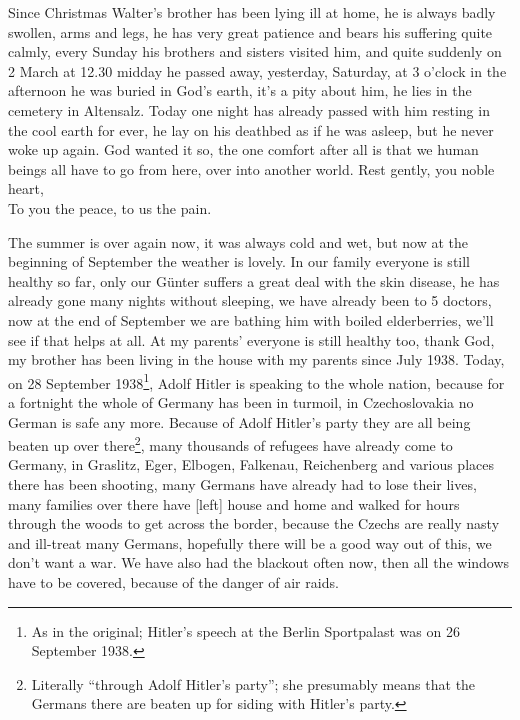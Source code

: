 \documentclass[a5paper,11pt,openany]{book}
\newcommand{\seite}[1]{\leavevmode\marginpar{\footnotesize\itshape\raggedright #1}\ignorespaces}
\newcommand{\jahr}[1]{\par\medskip\noindent{\scshape #1}\par\nopagebreak}
\begin{document}
\jahr{The year 1938.}
Since Christmas Walter's brother has been lying ill at home,
  he is always badly swollen, arms and legs,
  he has very great patience and bears his suffering quite calmly, every Sunday
\seite{43}
his brothers and sisters visited him, and quite suddenly on 2 March at 12.30 midday he passed away,
  yesterday, Saturday, at 3 o'clock in the afternoon he was buried in God's earth,
  it's a pity about him, he lies in the cemetery in Altensalz.
Today one night has already passed with him resting in the cool earth for ever,
  he lay on his deathbed as if he was asleep, but he never woke up again.
God wanted it so, the one comfort after all is that we human beings all have to go from here, over into another world.
Rest gently, you noble heart,\\
To you the peace, to us the pain.

\jahr{Autumn 1938.}
\seite{44}
The summer is over again now, it was always cold and wet, but now at the beginning of September the weather is lovely.
In our family everyone is still healthy so far, only our Günter suffers a great deal with the skin disease,
  he has already gone many nights without sleeping, we have already been to 5 doctors,
  now at the end of September we are bathing him with boiled elderberries, we'll see if that helps at all.
At my parents' everyone is still healthy too, thank God, my brother has been living in the house with my parents since July 1938.
Today,
\seite{45}
on 28 September 1938\footnote{As in the original; Hitler's speech at the Berlin Sportpalast was on 26 September 1938.}, Adolf Hitler is speaking to the whole nation, because for a fortnight the whole of Germany has been in turmoil,
  in Czechoslovakia no German is safe any more.
Because of Adolf Hitler's party they are all being beaten up over there\footnote{Literally ``through Adolf Hitler's party''; she presumably means that the Germans there are beaten up for siding with Hitler's party.},
  many thousands of refugees have already come to Germany,
  in Graslitz, Eger, Elbogen, Falkenau, Reichenberg and various places there has been shooting,
  many Germans have already had to lose their lives,
  many families over there have [left] house and home and walked for hours through the woods to get across the
\seite{46}
border, because the Czechs are really nasty and ill-treat many Germans,
  hopefully there will be a good way out of this, we don't want a war.
We have also had the blackout often now,
  then all the windows have to be covered, because of the danger of air raids.
\end{document}
